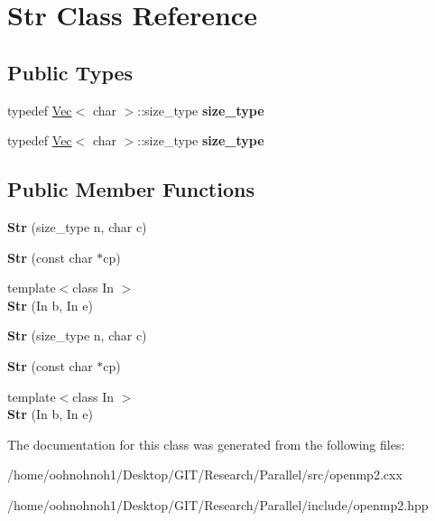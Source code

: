 \hypertarget{classStr}{}\section{Str Class Reference}
\label{classStr}
\subsection*{Public Types}
\begin{DoxyCompactItemize}
\item 
\mbox{\label{classStr_a8a51ef48a27e5e597fde5edd7d36f7d8}} 
typedef \hyperlink{classVec}{Vec}$<$ char $>$\+::size\+\_\+type {\bfseries size\+\_\+type}
\item 
\mbox{\label{classStr_a8a51ef48a27e5e597fde5edd7d36f7d8}} 
typedef \hyperlink{classVec}{Vec}$<$ char $>$\+::size\+\_\+type {\bfseries size\+\_\+type}
\end{DoxyCompactItemize}
\subsection*{Public Member Functions}
\begin{DoxyCompactItemize}
\item 
\mbox{\label{classStr_afedfc049e090cc83be3ea834948f28ba}} 
{\bfseries Str} (size\+\_\+type n, char c)
\item 
\mbox{\label{classStr_a8235816d2687bf223490568a18124cf4}} 
{\bfseries Str} (const char $\ast$cp)
\item 
\mbox{\label{classStr_a92caed2384063dca67f93a9788ed1115}} 
{\footnotesize template$<$class In $>$ }\\{\bfseries Str} (In b, In e)
\item 
\mbox{\label{classStr_afedfc049e090cc83be3ea834948f28ba}} 
{\bfseries Str} (size\+\_\+type n, char c)
\item 
\mbox{\label{classStr_a8235816d2687bf223490568a18124cf4}} 
{\bfseries Str} (const char $\ast$cp)
\item 
\mbox{\label{classStr_a92caed2384063dca67f93a9788ed1115}} 
{\footnotesize template$<$class In $>$ }\\{\bfseries Str} (In b, In e)
\end{DoxyCompactItemize}


The documentation for this class was generated from the following files\+:\begin{DoxyCompactItemize}
\item 
/home/oohnohnoh1/\+Desktop/\+G\+I\+T/\+Research/\+Parallel/src/openmp2.\+cxx\item 
/home/oohnohnoh1/\+Desktop/\+G\+I\+T/\+Research/\+Parallel/include/openmp2.\+hpp\end{DoxyCompactItemize}
